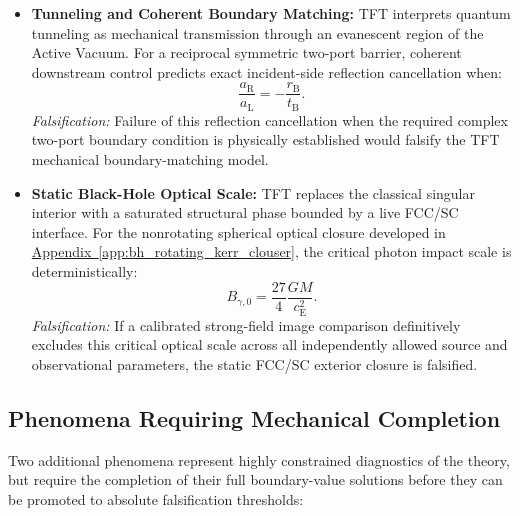 \begin{itemize}
    \item \textbf{Tunneling and Coherent Boundary Matching:} TFT interprets quantum tunneling as mechanical transmission through an evanescent region of the Active Vacuum. For a reciprocal symmetric two-port barrier, coherent downstream control predicts exact incident-side reflection cancellation when:
    \begin{equation}
        \frac{a_{\mathrm R}}{a_{\mathrm L}} = -\frac{r_{\mathrm B}}{t_{\mathrm B}}.
    \end{equation}
    \textit{Falsification:} Failure of this reflection cancellation when the required complex two-port boundary condition is physically established would falsify the TFT mechanical boundary-matching model.

    \item \textbf{Static Black-Hole Optical Scale:} TFT replaces the classical singular interior with a saturated structural phase bounded by a live FCC/SC interface. For the nonrotating spherical optical closure developed in \hyperref[app:bh_rotating_kerr_clouser]{Appendix~\ref*{app:bh_rotating_kerr_clouser}}, the critical photon impact scale is deterministically:
    \begin{equation}
        B_{\gamma,0} = \frac{27}{4} \frac{GM}{c_{\mathrm E}^{2}}.
    \end{equation}
    \textit{Falsification:} If a calibrated strong-field image comparison definitively excludes this critical optical scale across all independently allowed source and observational parameters, the static FCC/SC exterior closure is falsified.
\end{itemize}

\subsection*{Phenomena Requiring Mechanical Completion}

Two additional phenomena represent highly constrained diagnostics of the theory, but require the completion of their full boundary-value solutions before they can be promoted to absolute falsification thresholds:

